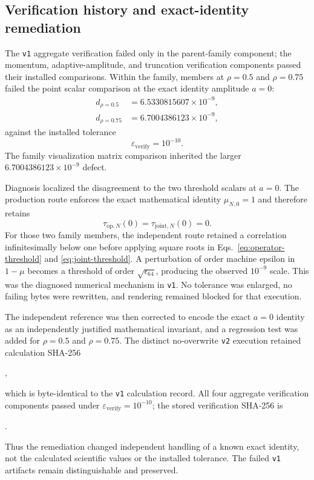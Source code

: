 \subsection{Verification history and exact-identity remediation}

The \texttt{v1} aggregate verification failed only in the parent-family component; the
momentum, adaptive-amplitude, and truncation verification components passed their installed
comparisons.  Within the family, members at $\rho=0.5$ and $\rho=0.75$ failed the point
scalar comparison at the exact identity amplitude $a=0$:
\begin{align}
 d_{\rho=0.5}&=6.5330815607\times10^{-9},\\
 d_{\rho=0.75}&=6.7004386123\times10^{-9},
\end{align}
against the installed tolerance
\begin{equation}
 \varepsilon_{\mathrm{verify}}=10^{-10}.
\end{equation}
The family visualization matrix comparison inherited the larger
$6.7004386123\times10^{-9}$ defect.

Diagnosis localized the disagreement to the two threshold scalars at $a=0$.  The
production route enforces the exact mathematical identity $\mu_{N,0}=1$ and therefore
retains
\begin{equation}
 \tau_{\mathrm{op},N}(0)=\tau_{\mathrm{joint},N}(0)=0.
\end{equation}
For those two family members, the independent route retained a correlation infinitesimally
below one before applying square roots in Eqs.~\eqref{eq:operator-threshold} and
\eqref{eq:joint-threshold}.  A perturbation of order machine epsilon in $1-\mu$ becomes
a threshold of order $\sqrt{\epsilon_{64}}$, producing the observed $10^{-9}$ scale.
This was the diagnosed numerical mechanism in \texttt{v1}.  No tolerance was enlarged,
no failing bytes were rewritten, and rendering remained blocked for that execution.

The independent reference was then corrected to encode the exact $a=0$ identity as an
independently justified mathematical invariant, and a regression test was added for
$\rho=0.5$ and $\rho=0.75$.  The distinct no-overwrite \texttt{v2} execution retained
calculation SHA-256
\begin{center}
,
\end{center}
which is byte-identical to the \texttt{v1} calculation record.  All four aggregate
verification components passed under $\varepsilon_{\mathrm{verify}}=10^{-10}$; the
stored verification SHA-256 is
\begin{center}
.
\end{center}
Thus the remediation changed independent handling of a known exact identity, not the
calculated scientific values or the installed tolerance.  The failed \texttt{v1}
artifacts remain distinguishable and preserved.

